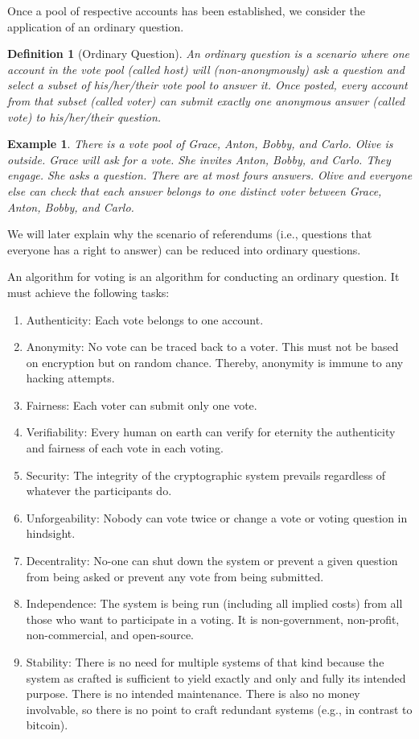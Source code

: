 \documentclass{article}
\newtheorem{xpl}[thm]{Example}
\newtheorem{defn}[thm]{Definition}
\theoremstyle{definition}
\begin{document}
	Once a pool of respective accounts has been established, we consider the application of an ordinary question.
	
	\begin{defn}[Ordinary Question]
		An ordinary question is a scenario where one account in the vote pool (called host) will (non-anonymously) ask a question and select a subset of his/her/their vote pool to answer it. Once posted, every account from that subset (called voter) can submit exactly one anonymous answer (called vote) to his/her/their question.
	\end{defn}
	
	\begin{xpl}
		There is a vote pool of Grace, Anton, Bobby, and Carlo. Olive is outside. Grace will ask for a vote. She invites Anton, Bobby, and Carlo. They engage. She asks a question. There are at most fours answers. Olive and everyone else can check that each answer belongs to one distinct voter between Grace, Anton, Bobby, and Carlo.
	\end{xpl}
	
	We will later explain why the scenario of referendums (i.e., questions that everyone has a right to answer) can be reduced into ordinary questions.
	
	An algorithm for voting is an algorithm for conducting an ordinary question. It must achieve the following tasks:
	\begin{enumerate}
		\item Authenticity: Each vote belongs to one account.
		\item Anonymity: No vote can be traced back to a voter. This must not be based on encryption but on random chance. Thereby, anonymity is immune to any hacking attempts.
		\item Fairness: Each voter can submit only one vote.
		\item Verifiability: Every human on earth can verify for eternity the authenticity and fairness of each vote in each voting.
		\item Security: The integrity of the cryptographic system prevails regardless of whatever the participants do.
		\item Unforgeability: Nobody can vote twice or change a vote or voting question in hindsight.
		\item Decentrality: No-one can shut down the system or prevent a given question from being asked or prevent any vote from being submitted.
		\item Independence: The system is being run (including all implied costs) from all those who want to participate in a voting. It is non-government, non-profit, non-commercial, and open-source.
		\item Stability: There is no need for multiple systems of that kind because the system as crafted is sufficient to yield exactly and only and fully its intended purpose. There is no intended maintenance. There is also no money involvable, so there is no point to craft redundant systems (e.g., in contrast to bitcoin).
	\end{enumerate}
	
\end{document}
